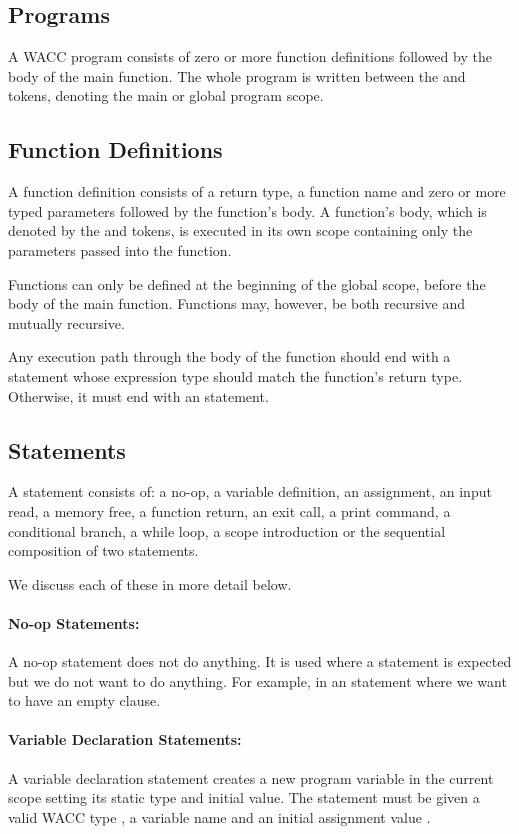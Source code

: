 \documentclass[a4paper]{article}
\theoremstyle{definition}
\begin{document}
\subsection{Programs}
A WACC program  consists of zero or more function definitions followed by the body of the main function.
The whole program is written between the  and  tokens, denoting the main or global program scope.

\subsection{Function Definitions}
A function definition  consists of a return type, a function name
and zero or more typed parameters followed by the function's body.
A function's body, which is denoted by the  and  tokens, is executed in its own scope
containing only the parameters passed into the function.

Functions can only be defined at the beginning of the global scope, before the body of the main function.
Functions may, however, be both recursive and mutually recursive.

Any execution path through the body of the function should end with a  statement
whose expression type should match the function's return type. Otherwise, it must end with an  statement.

\subsection{Statements}
A statement  consists of:
a no-op,
a variable definition,
an assignment,
an input read,
a memory free,
a function return,
an exit call,
a print command,
a conditional branch,
a while loop,
a scope introduction
or the sequential composition of two statements.

We discuss each of these in more detail below.

\paragraph{No-op Statements:}
A no-op statement  does not do anything.
It is used where a statement is expected but we do not want to do anything.
For example, in an  statement where we want to have an empty  clause.

\paragraph{Variable Declaration Statements:}
A variable declaration statement creates a new program variable in the current scope setting its static type and initial value.
The statement must be given a valid WACC type , a variable name  and an initial assignment value .
\end{document}
